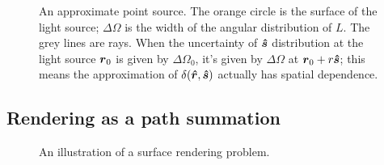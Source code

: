 \documentclass[hyperref, a4paper]{article}
\begin{document}
\begin{figure}
    \centering
    
    \caption{An approximate point source. The orange circle is the surface of the light source; 
    $\Delta \Omega$ is the width of the angular distribution of $L$. 
    The grey lines are rays. 
    When the uncertainty of $\vu*{s}$ distribution at the light source $\vb*{r}_0$ is 
    given by $\Delta \Omega_0$,
    it's given by $\Delta \Omega$ at $\vb*{r}_0 + r \vu*{s}$; 
    this means the approximation of $\delta(\vu*{r}, \vu*{s})$ actually 
    has spatial dependence.}
    \label{fig:approx-point-source}
\end{figure}

\subsection{Rendering as a path summation}

\begin{figure}
    \centering
    
    \caption{An illustration of a surface rendering problem. }
    \label{fig:surface-rendering-example}
\end{figure}
\end{document}
